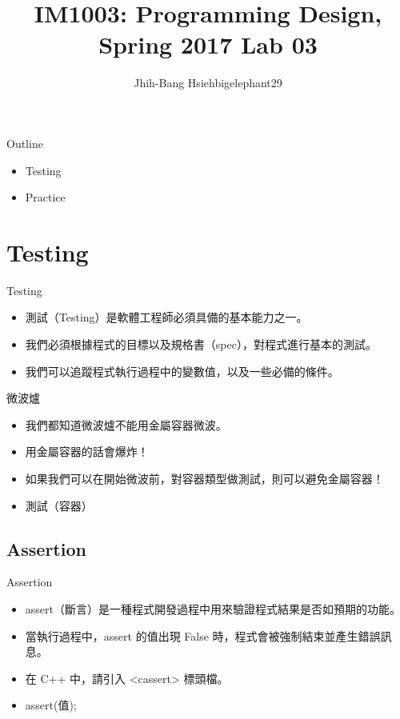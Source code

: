\documentclass[t]{beamer}
\title{IM1003: Programming Design, Spring 2017  \linebreak Lab 03}
\author[bigelephant29]{Jhih-Bang Hsieh\linebreak \small{bigelephant29}}
\institute{\textbf{National Taiwan University}}
\date{}
\begin{document}
\begin{frame}
  \maketitle
\end{frame}

\begin{frame}{Outline}
  \begin{itemize}
    \item Testing
    \item Practice
  \end{itemize}
\end{frame}

\section{Testing}
\begin{frame}{Testing}
  \begin{itemize}
    \item 測試（Testing）是軟體工程師必須具備的基本能力之一。
    \item 我們必須根據程式的目標以及規格書（spec），對程式進行基本的測試。
    \item 我們可以追蹤程式執行過程中的變數值，以及一些必備的條件。
  \end{itemize}
\end{frame}

\begin{frame}{微波爐}
  \begin{itemize}
    \item 我們都知道微波爐不能用金屬容器微波。
    \item 用金屬容器的話會爆炸！
    \item 如果我們可以在開始微波前，對容器類型做測試，則可以避免金屬容器！
    \item 測試（容器）
  \end{itemize}
\end{frame}

\subsection{Assertion}
\begin{frame}{Assertion}
  \begin{itemize}
    \item assert（斷言）是一種程式開發過程中用來驗證程式結果是否如預期的功能。
    \item 當執行過程中，assert 的值出現 False 時，程式會被強制結束並產生錯誤訊息。
    \item 在 C++ 中，請引入 <cassert> 標頭檔。
    \item assert(值);
  \end{itemize}
\end{frame}
\end{document}
